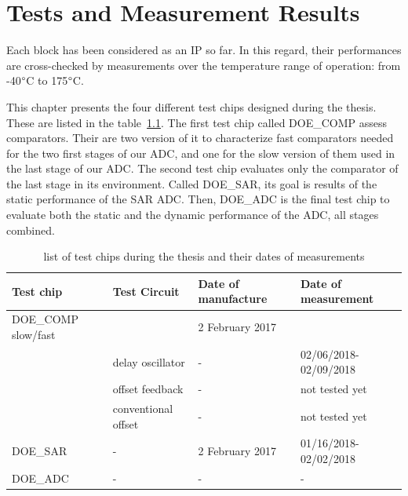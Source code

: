 \chapter{Tests and Measurement Results}
\label{sec:tests-meas}
\ifpdf
    \graphicspath{{Chapter5/Figs/Raster/}{Chapter5/Figs/PDF/}{Chapter5/Figs/}}
\else
    \graphicspath{{Chapter5/Figs/Vector/}{Chapter5/Figs/}}
\fi 

Each block has been considered as an IP so far. In this regard, their performances are cross-checked by measurements over the temperature range of operation: from -40$\degree$C to 175$\degree$C.

This chapter presents the four different test chips designed during the thesis. These are listed in the table~\ref{tbl:test-chip-list-and-dates}. The first test chip called DOE\_COMP assess comparators. Their are two version of it to characterize fast comparators needed for the two first stages of our ADC, and one for the slow version of them used in the last stage of our ADC. The second test chip evaluates only the comparator of the last stage in its environment. Called DOE\_SAR, its goal is results of the static performance of the SAR ADC\@. Then, DOE\_ADC is the final test chip to evaluate both the static and the dynamic performance of the ADC, all stages combined.


\begin{table}[htp]
    \label{tbl:test-chip-list-and-dates}
    \caption{list of test chips during the thesis and their dates of measurements}
    \begin{tabular}{@{}llll@{}}
    \toprule
    Test chip           & Test Circuit        & Date of manufacture & Date of measurement   \\ \midrule
    DOE\_COMP slow/fast &                     & 2 February 2017     &                       \\
                        & delay oscillator    & -                   & 02/06/2018-02/09/2018 \\
                        & offset feedback     & -                   & not tested yet        \\
                        & conventional offset & -                   & not tested yet        \\
    DOE\_SAR            & -                   & 2 February 2017     & 01/16/2018-02/02/2018 \\
    DOE\_ADC            & -                   & -                   & -                     \\ \bottomrule
    \end{tabular}
\end{table}


